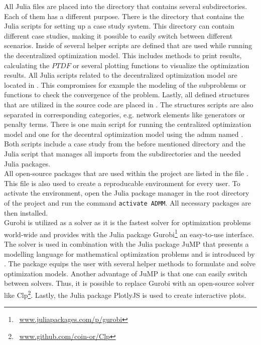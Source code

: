 All Julia files are placed into the directory  that contains several subdirectories. Each of them has a different purpose. There is the  directory that contains the Julia scripts for setting up a case study system. This directory can contain different case studies, making it possible to easily switch between different scenarios. Inside of  several helper scripts are defined that are used while running the decentralized optimization model. This includes methods to print results, calculating the $PTDF$ or several plotting functions to visualize the optimization results. All Julia scripts related to the decentralized optimization model are located in . This compromises for example the modeling of the subproblems or functions to check the convergence of the problem. Lastly, all defined structures that are utilized in the source code are placed in . The structures scripts are also separated in corresponding categories, e.g. network elements like generators or penalty terms. There is one main script for running the centralized optimization model  and one for the decentral optimization model using the \gls{admm} named . Both scripts include a case study from the before mentioned directory and the Julia script  that manages all imports from the subdirectories and the needed Julia packages.\\

All open-source packages that are used within the project are listed in the file . This file is also used to create a reproducable environment for every user. To activate the environment, open the Julia package manager in the root directory of the project and run the command \lstinline[language=sh]{activate ADMM}. All necessary packages are then installed.\\

Gurobi is utilized as a solver as it is the fastest solver for optimization problems world-wide and provides with the Julia package Gurobi\footnote{~\url{www.juliapackages.com/p/gurobi}} an easy-to-use interface. The solver is used in combination with the Julia package JuMP that presents a modelling language for mathematical optimization problems and is introduced by \citet{dunning2017}. The package equips the user with several helper methods to formulate and solve optimization models. Another advantage of JuMP is that one can easily switch between solvers. Thus, it is possible to replace Gurobi with an open-source solver like Clp\footnote{~\url{www.github.com/coin-or/Clp}}. Lastly, the  Julia package PlotlyJS is used to create interactive plots.

